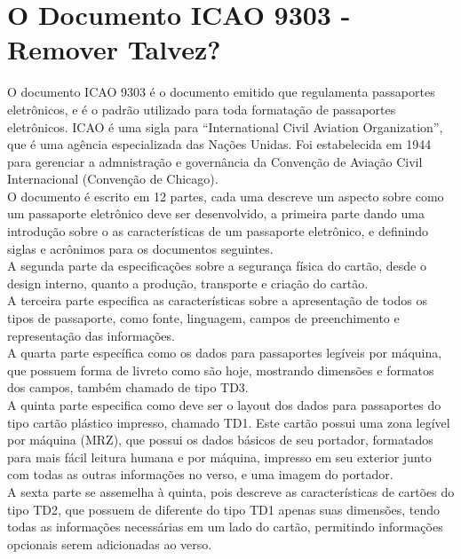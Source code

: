 \documentclass{article}
\begin{document}
	\section{O Documento ICAO 9303\cite{ICAO} - Remover Talvez?}
		\begin{justify}
			
				\hspace*{2cm} O documento ICAO 9303 é o documento emitido que regulamenta passaportes eletrônicos, e é o padrão utilizado para toda formatação de passaportes eletrônicos. ICAO é uma sigla para “International Civil Aviation Organization”, que é uma agência especializada das Nações Unidas. Foi estabelecida em 1944 para gerenciar a admnistração e governância da Convenção de Aviação Civil Internacional (Convenção de Chicago). \\
    			\hspace*{2cm} O documento é escrito em 12 partes, cada uma descreve um aspecto sobre como um passaporte eletrônico deve ser desenvolvido, a primeira parte dando uma introdução sobre o as características de um passaporte eletrônico, e definindo siglas e acrônimos para os documentos seguintes.\\
    			\hspace*{2cm} A segunda parte da especificações sobre a segurança física do cartão, desde o design interno, quanto a produção, transporte e criação do cartão. \\
				\hspace*{2cm} A terceira parte especifica as características sobre a apresentação de todos os tipos de passaporte, como fonte, linguagem, campos de preenchimento e representação das informações. \\
				\hspace*{2cm} A quarta parte específica como os dados para passaportes legíveis por máquina, que possuem forma de livreto como são hoje, mostrando dimensões e formatos dos campos, também chamado de tipo TD3. \\
				\hspace*{2cm} A quinta parte especifica como deve ser o layout dos dados para passaportes do tipo cartão plástico impresso, chamado TD1. Este cartão possui uma zona legível por máquina (MRZ), que possui os dados básicos de seu portador, formatados para mais fácil leitura humana e por máquina, impresso em seu exterior junto com todas as outras informações no verso, e uma imagem do portador.\\
				\hspace*{2cm} A sexta parte se assemelha à quinta, pois descreve as características de cartões do tipo TD2, que possuem de diferente do tipo TD1 apenas suas dimensões, tendo todas as informações necessárias em um lado do cartão, permitindo informações opcionais serem adicionadas ao verso.\\

\end{justify}
\end{document}
